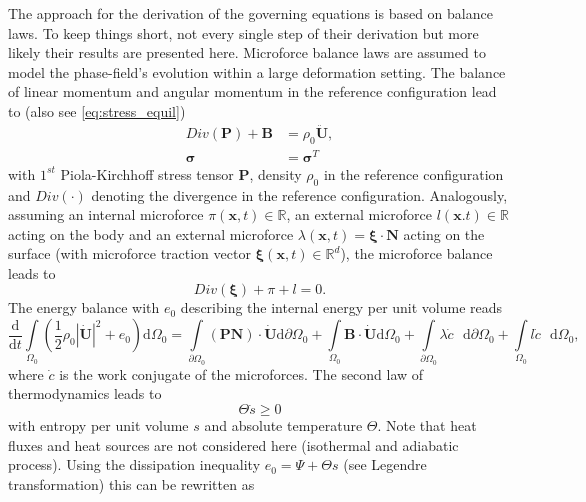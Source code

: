 The approach for the derivation of the governing equations is based on balance laws. To keep things short, not every single step of their derivation but more likely their results are presented here. Microforce balance laws are assumed to model the phase-field's evolution within a large deformation setting. The balance of linear momentum and angular momentum in the reference configuration lead to (also see \eqref{eq:stress_equil})
\begin{equation} \label{eq:lin_mom_ang_mom}
	\begin{aligned}
		Div\left(\mathbf{P}\right)+\mathbf{B}&=\rho_{0}\ddot{\mathbf{U}}, \\
		\bm{\sigma} &= \bm{\sigma}^{T}
	\end{aligned}
\end{equation}
with $1^{st}$ Piola-Kirchhoff stress tensor $\mathbf{P}$, density $\rho_{0}$ in the reference configuration and $Div\left(\cdot\right)$ denoting the divergence in the reference configuration. Analogously, assuming an internal microforce $\pi\left(\mathbf{x},t\right)\in\mathbb{R}$, an external microforce $l\left(\mathbf{x}.t\right)\in\mathbb{R}$ acting on the body and an external microforce $\lambda\left(\mathbf{x},t\right)=\bm{\xi}\cdot\mathbf{N}$ acting on the surface (with microforce traction vector $\bm{\xi}\left(\mathbf{x},t\right)\in\mathbb{R}^{d}$), the microforce balance leads to
\begin{equation} \label{eq:microforce_balance}
	Div\left(\bm{\xi}\right)+\pi+l=0.
\end{equation}
The energy balance with $e_{0}$ describing the internal energy per unit volume reads
\begin{equation} \label{eq:energy_balance}
	\dfrac{\mathrm{d}}{\mathrm{d}t}\int\limits_{\Omega_{0}}\left(\dfrac{1}{2}\rho_{0}|\dot{\mathbf{U}}|^{2}+e_{0}\right)\mathrm{d}\Omega_{0} = 
	\int\limits_{\partial\Omega_{0}}\left(\mathbf{P}\mathbf{N}\right)\cdot\dot{\mathbf{U}}\mathrm{d}\partial\Omega_{0}+\int\limits_{\Omega_{0}}\mathbf{B}\cdot\dot{\mathbf{U}}\mathrm{d}\Omega_{0}+\int\limits_{\partial\Omega_{0}}\lambda\dot{c}\text{ }\mathrm{d}\partial\Omega_{0}+\int\limits_{\Omega_{0}}l\dot{c}\text{ }\mathrm{d}\Omega_{0},
\end{equation}
where $\dot{c}$ is the work conjugate of the microforces. The second law of thermodynamics leads to
\begin{equation}
	\Theta\dot{s}\geq0
\end{equation}
with entropy per unit volume $s$ and absolute temperature $\Theta$. Note that heat fluxes and heat sources are not considered here (isothermal and adiabatic process). Using the dissipation inequality $e_{0}=\Psi+\Theta  s$ (see Legendre transformation) this can be rewritten as
